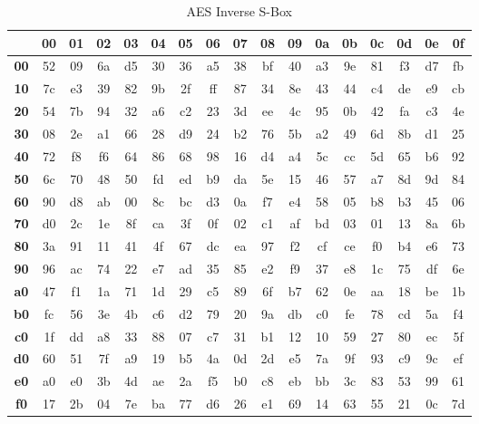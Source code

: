 \begin{table}[h]
    \centering
    \begin{tabular}	{|c|c|c|c|c|c|c|c|c|c|c|c|c|c|c|c|c|}
        \hline
        & \textbf{00} & \textbf{01} & \textbf{02} & \textbf{03} & \textbf{04} & \textbf{05} & \textbf{06} & \textbf{07} & \textbf{08} & \textbf{09} & \textbf{0a} & \textbf{0b} & \textbf{0c} & \textbf{0d} & \textbf{0e} & \textbf{0f} \\
        \hline
        \textbf{00} & 52 & 09 & 6a & d5 & 30 & 36 & a5 & 38 & bf & 40 & a3 & 9e & 81 & f3 & d7 & fb \\
        \hline
        \textbf{10} & 7c & e3 & 39 & 82 & 9b & 2f & ff & 87 & 34 & 8e & 43 & 44 & c4 & de & e9 & cb \\
        \hline
        \textbf{20} & 54 & 7b & 94 & 32 & a6 & c2 & 23 & 3d & ee & 4c & 95 & 0b & 42 & fa & c3 & 4e \\
        \hline
        \textbf{30} & 08 & 2e & a1 & 66 & 28 & d9 & 24 & b2 & 76 & 5b & a2 & 49 & 6d & 8b & d1 & 25 \\
        \hline
        \textbf{40} & 72 & f8 & f6 & 64 & 86 & 68 & 98 & 16 & d4 & a4 & 5c & cc & 5d & 65 & b6 & 92 \\
        \hline
        \textbf{50} & 6c & 70 & 48 & 50 & fd & ed & b9 & da & 5e & 15 & 46 & 57 & a7 & 8d & 9d & 84 \\
        \hline
        \textbf{60} & 90 & d8 & ab & 00 & 8c & bc & d3 & 0a & f7 & e4 & 58 & 05 & b8 & b3 & 45 & 06 \\
        \hline
        \textbf{70} & d0 & 2c & 1e & 8f & ca & 3f & 0f & 02 & c1 & af & bd & 03 & 01 & 13 & 8a & 6b \\
        \hline
        \textbf{80} & 3a & 91 & 11 & 41 & 4f & 67 & dc & ea & 97 & f2 & cf & ce & f0 & b4 & e6 & 73 \\
        \hline
        \textbf{90} & 96 & ac & 74 & 22 & e7 & ad & 35 & 85 & e2 & f9 & 37 & e8 & 1c & 75 & df & 6e \\
        \hline
        \textbf{a0} & 47 & f1 & 1a & 71 & 1d & 29 & c5 & 89 & 6f & b7 & 62 & 0e & aa & 18 & be & 1b \\
        \hline
        \textbf{b0} & fc & 56 & 3e & 4b & c6 & d2 & 79 & 20 & 9a & db & c0 & fe & 78 & cd & 5a & f4 \\
        \hline
        \textbf{c0} & 1f & dd & a8 & 33 & 88 & 07 & c7 & 31 & b1 & 12 & 10 & 59 & 27 & 80 & ec & 5f \\
        \hline
        \textbf{d0} & 60 & 51 & 7f & a9 & 19 & b5 & 4a & 0d & 2d & e5 & 7a & 9f & 93 & c9 & 9c & ef \\
        \hline
        \textbf{e0} & a0 & e0 & 3b & 4d & ae & 2a & f5 & b0 & c8 & eb & bb & 3c & 83 & 53 & 99 & 61 \\
        \hline
        \textbf{f0} & 17 & 2b & 04 & 7e & ba & 77 & d6 & 26 & e1 & 69 & 14 & 63 & 55 & 21 & 0c & 7d \\
        \hline
    \end{tabular}
    \caption{AES Inverse S-Box}
    \label{iS-Box}
\end{table}


